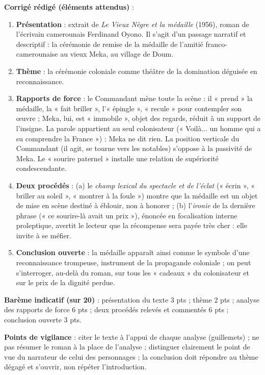 \documentclass[11pt]{article}
\begin{document}
\begin{corrige}
\textbf{Corrigé rédigé (éléments attendus)} :

\begin{enumerate}
\item \textbf{Présentation} : extrait de \emph{Le Vieux Nègre et la médaille} (1956), roman de l'écrivain camerounais Ferdinand Oyono. Il s'agit d'un passage narratif et descriptif : la cérémonie de remise de la médaille de l'amitié franco-camerounaise au vieux Meka, au village de Doum.
\item \textbf{Thème} : la cérémonie coloniale comme théâtre de la domination déguisée en reconnaissance.
\item \textbf{Rapports de force} : le Commandant mène toute la scène : il « prend » la médaille, la « fait briller », l'« épingle », « recule » pour contempler son œuvre ; Meka, lui, est « immobile », objet des regards, réduit à un support de l'insigne. La parole appartient au seul colonisateur (« Voilà... un homme qui a su comprendre la France ») : Meka ne dit rien. La position verticale du Commandant (il agit, se tourne vers les notables) s'oppose à la passivité de Meka. Le « sourire paternel » installe une relation de supériorité condescendante.
\item \textbf{Deux procédés} : (a) le \emph{champ lexical du spectacle et de l'éclat} (« écrin », « briller au soleil », « montrer à la foule ») montre que la médaille est un objet de mise en scène destiné à éblouir, non à honorer ; (b) l'\emph{ironie} de la dernière phrase (« ce sourire-là avait un prix »), énoncée en focalisation interne proleptique, avertit le lecteur que la récompense sera payée très cher : elle invite à se méfier.
\item \textbf{Conclusion ouverte} : la médaille apparaît ainsi comme le symbole d'une reconnaissance trompeuse, instrument de la propagande coloniale ; on peut s'interroger, au-delà du roman, sur tous les « cadeaux » du colonisateur et sur le prix de la dignité perdue.
\end{enumerate}

\textbf{Barème indicatif (sur 20)} : présentation du texte 3 pts ; thème 2 pts ; analyse des rapports de force 6 pts ; deux procédés relevés et commentés 6 pts ; conclusion ouverte 3 pts.

\textbf{Points de vigilance} : citer le texte à l'appui de chaque analyse (guillemets) ; ne pas résumer le roman à la place de l'analyse ; distinguer clairement le point de vue du narrateur de celui des personnages ; la conclusion doit répondre au thème dégagé et s'ouvrir, non répéter l'introduction.
\end{corrige}
\end{document}
